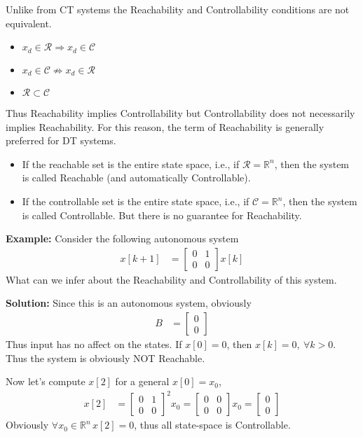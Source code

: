 \documentclass[twoside]{article}
\begin{document}
Unlike from CT systems the Reachability and Controllability conditions 
are not equivalent. 

\begin{itemize}
  \item $x_d \in \mathcal{R} \Rightarrow x_d \in \mathcal{C}$
  \item $x_d \in \mathcal{C} \not\Rightarrow  x_d \in \mathcal{R}$
  \item $\mathcal{R} \subset \mathcal{C}$
\end{itemize}

Thus Reachability implies Controllability but Controllability does not
necessarily implies Reachability. For this reason, the term of Reachability 
is generally preferred for DT systems.

\begin{itemize}
  \item If the reachable set is the entire state
    space, i.e., if $\mathcal{R} = \mathbb{R}^n$, then the system is
    called Reachable (and automatically Controllable).
  \item If the controllable set is the entire state
    space, i.e., if $\mathcal{C} = \mathbb{R}^n$, then the system is
    called Controllable. But there is no guarantee for Reachability.  
\end{itemize}

\textbf{Example:} Consider the following autonomous system
%
\begin{align*}
  x[k+1] &= \left[ \begin{array}{cc} 0 & 1 \\ 0 & 0 \end{array} \right] x[k] 
\end{align*}
%
What can we infer about the Reachability and Controllability of this
system.

\textbf{Solution:} Since this is an autonomous system, obviously 
%
\begin{align*}
 B &= \left[ \begin{array}{c} 0 \\ 0 \end{array} \right] 
\end{align*}
%
Thus input has no affect on the states. If $x[0] = 0$, then
$x[k] = 0 , \ \forall k > 0$. Thus the system is obviously 
NOT Reachable. 

Now let's compute $x[2]$ for a general $x[0] = x_0$,
\begin{align*}
 x[2] &= \left[ \begin{array}{cc} 0 & 1 \\ 0 & 0 \end{array} \right]^2 x_0
= \left[ \begin{array}{cc} 0 & 0 \\ 0 & 0 \end{array} \right] x_0
= \left[ \begin{array}{c} 0 \\ 0 \end{array} \right]  
\end{align*}
%
Obviously $\forall x_0 \in \mathbb{R}^n \, x[2] = 0$, thus all
state-space is Controllable. 
\end{document}
